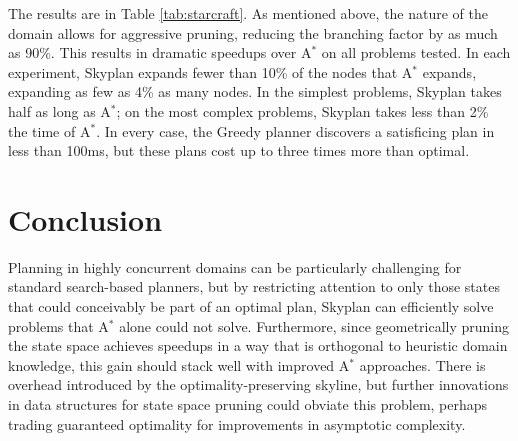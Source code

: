 \documentclass[letterpaper]{article}
\theoremstyle{plain} \newtheorem{theorem}{Theorem} \newtheorem{proposition}{Proposition} \newtheorem{lemma}{Lemma}
\theoremstyle{definition} \newtheorem{definition}{Definition} \newtheorem{conjecture}{Conjecture} \newtheorem*{example}{Example}
\theoremstyle{remark} \newtheorem*{remark}{Remark} \newtheorem*{note}{Note} \newtheorem{case}{Case}
\newcommand{\Astar}{A$^*$ }
\newcommand{\Astarpunct}{A$^*$}
\begin{document}
The results are in Table \ref{tab:starcraft}. As mentioned above, the nature of the domain allows for aggressive pruning, reducing the branching factor by as much as 90\%.
This results in dramatic speedups over \Astar on all problems tested.
In each experiment, Skyplan expands fewer than 10\% of the nodes that \Astar expands, expanding as few as 4\% as many nodes. 
In the simplest problems, Skyplan takes half as long as \Astarpunct; on the most complex problems, Skyplan takes less than 2\% the time
of \Astarpunct. In every case, the Greedy planner discovers a satisficing plan in less than 100ms, 
but these plans cost up to three times more than optimal.


\section{Conclusion}

Planning in highly concurrent domains can be particularly challenging for standard
search-based planners, but by restricting attention to only those states that could
conceivably be part of an optimal plan, Skyplan can efficiently solve problems that
\Astar alone could not solve. Furthermore, since
geometrically pruning the state space achieves speedups in a way that is orthogonal to
heuristic domain knowledge, this gain should stack well with improved \Astar approaches. There
is overhead introduced by the optimality-preserving skyline, but further innovations in
data structures for state space pruning could obviate this problem, perhaps trading
guaranteed optimality for improvements in asymptotic complexity.



\end{document}
